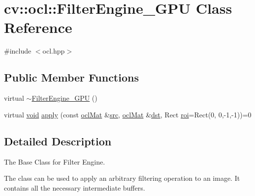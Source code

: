 \hypertarget{classcv_1_1ocl_1_1FilterEngine__GPU}{\section{cv\-:\-:ocl\-:\-:Filter\-Engine\-\_\-\-G\-P\-U Class Reference}
\label{classcv_1_1ocl_1_1FilterEngine__GPU}
}


{\ttfamily \#include $<$ocl.\-hpp$>$}

\subsection*{Public Member Functions}
\begin{DoxyCompactItemize}
\item 
virtual \hyperlink{classcv_1_1ocl_1_1FilterEngine__GPU_ad2a5b7a8a5208bd5747dab9020af836d}{$\sim$\-Filter\-Engine\-\_\-\-G\-P\-U} ()
\item 
virtual \hyperlink{legacy_8hpp_a8bb47f092d473522721002c86c13b94e}{void} \hyperlink{classcv_1_1ocl_1_1FilterEngine__GPU_a00cbc3dc060fa4c2bd3a5bcd1cad500f}{apply} (const \hyperlink{classcv_1_1ocl_1_1oclMat}{ocl\-Mat} \&\hyperlink{legacy_8hpp_a371cd109b74033bc4366f584edd3dacc}{src}, \hyperlink{classcv_1_1ocl_1_1oclMat}{ocl\-Mat} \&\hyperlink{photo__c_8h_aed13e2a25279b24dc954073233fef7a5}{dst}, Rect \hyperlink{legacy_8hpp_a22e52b2b51d064865d3ac2f27b308c33}{roi}=Rect(0, 0,-\/1,-\/1))=0
\end{DoxyCompactItemize}


\subsection{Detailed Description}
The Base Class for Filter Engine.

The class can be used to apply an arbitrary filtering operation to an image. It contains all the necessary intermediate buffers. 

